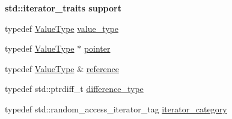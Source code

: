 \begin{Indent}\textbf{ std\+:\+:iterator\+\_\+traits support}\par
\begin{DoxyCompactItemize}
\item 
typedef \hyperlink{classGenericMemberIterator_a1323c9d064a9c388a1eb62a6e2c17584}{Value\+Type} \hyperlink{classGenericMemberIterator_a79326e02032d06d80e09ded797501553}{value\+\_\+type}
\item 
typedef \hyperlink{classGenericMemberIterator_a1323c9d064a9c388a1eb62a6e2c17584}{Value\+Type} $\ast$ \hyperlink{classGenericMemberIterator_a7c3623bc81b06495fd3128398487e99e}{pointer}
\item 
typedef \hyperlink{classGenericMemberIterator_a1323c9d064a9c388a1eb62a6e2c17584}{Value\+Type} \& \hyperlink{classGenericMemberIterator_a182876d698903331bd0b11db6d1beeca}{reference}
\item 
typedef std\+::ptrdiff\+\_\+t \hyperlink{classGenericMemberIterator_ae60bbcbaec51d36eef299996543872e6}{difference\+\_\+type}
\item 
typedef std\+::random\+\_\+access\+\_\+iterator\+\_\+tag \hyperlink{classGenericMemberIterator_a36cd90aef13c0cce916929f63fdb5c86}{iterator\+\_\+category}
\end{DoxyCompactItemize}
\end{Indent}
